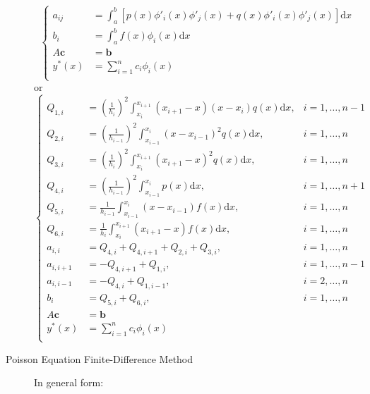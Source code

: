 \documentclass[8pt]{article}
\newcommand{\dd}[1]{\mathrm{d}{#1}}
\begin{document}
\begin{multicols}{2}
\begin{description}
    \begin{equation*}
      \left\{
        \begin{aligned}
          a_{ij} &=
          \int_a^b[p(x)\phi'_i(x)\phi'_j(x)+q(x)\phi'_i(x)\phi'_j(x)]\dd{x} \\
          b_i &= \int_a^bf(x)\phi_i(x)\dd{x} \\
          A\mathbf{c} &= \mathbf{b} \\
          y^*(x) &= \sum_{i=1}^{n}c_i\phi_i(x) \\
        \end{aligned}
      \right.
    \end{equation*}
    or
    \begin{equation*}
      \left\{
        \begin{aligned}
          Q_{1,i}&=\left(\frac{1}{h_{i}}\right)^2\int_{x_i}^{x_{i+1}}(x_{i+1}-x)(x-x_{i})q(x)\dd{x},& i=1,\ldots,n-1 \\
          Q_{2,i}&=\left(\frac{1}{h_{i-1}}\right)^2\int_{x_{i-1}}^{x_{i}}(x-x_{i-1})^2q(x)\dd{x},& i=1,\ldots,n \\
          Q_{3,i}&=\left(\frac{1}{h_{i}}\right)^2\int_{x_i}^{x_{i+1}}(x_{i+1}-x)^2q(x)\dd{x},& i=1,\ldots,n \\
          Q_{4,i}&=\left(\frac{1}{h_{i-1}}\right)^2\int_{x_{i-1}}^{x_{i}}p(x)\dd{x},& i=1,\ldots,n+1 \\
          Q_{5,i}&=\frac{1}{h_{i-1}}\int_{x_{i-1}}^{x_{i}}(x-x_{i-1})f(x)\dd{x},& i=1,\ldots,n \\
          Q_{6,i}&=\frac{1}{h_{i}}\int_{x_i}^{x_{i+1}}(x_{i+1}-x)f(x)\dd{x},& i=1,\ldots,n \\
          a_{i,i} &= Q_{4,i}+Q_{4,i+1}+Q_{2,i}+Q_{3,i},& i=1,\ldots,n \\
          a_{i,i+1} &= -Q_{4,i+1}+Q_{1,i},& i=1,\ldots,n-1 \\
          a_{i,i-1} &= -Q_{4,i}+Q_{1,i-1},& i=2,\ldots,n \\
          b_{i} &= Q_{5,i}+Q_{6,i},& i=1,\ldots,n \\
          A\mathbf{c} &= \mathbf{b} \\
          y^*(x) &= \sum_{i=1}^{n}c_i\phi_i(x) \\
        \end{aligned}
      \right.
    \end{equation*}
  \item[Poisson Equation Finite-Difference Method]
    In general form:
    \begin{equation*}
      \begin{aligned}

\end{aligned}
\end{equation*}
\end{description}
\end{multicols}
\end{document}
